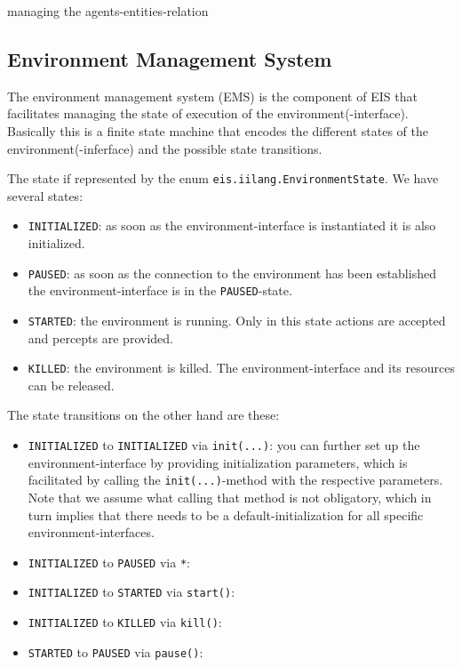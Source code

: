 \documentclass[a4]{article}
\newcommand{\EIS}{\textsf{EIS}\xspace}
\begin{document}
managing the agents-entities-relation

\subsection{Environment Management System}

The environment management system (EMS) is the component of \EIS that facilitates managing the
state of execution of the environment(-interface). Basically this is a finite state machine that encodes the different
states of the environment(-inferface) and the possible state transitions.

The state if represented by the enum \texttt{eis.iilang.EnvironmentState}.
We have several states:
\begin{itemize}
\item\texttt{INITIALIZED}: 
as soon as the environment-interface is instantiated it is also initialized. 
\item\texttt{PAUSED}: as soon as the connection to the environment has been
established the environment-interface is in the \texttt{PAUSED}-state.
\item\texttt{STARTED}: the environment is running. Only in this state actions are accepted and 
percepts are provided. 
\item\texttt{KILLED}: the environment is killed. The environment-interface  and its resources can be released.
\end{itemize}

The state transitions on the other hand are these:
\begin{itemize}
\item \texttt{INITIALIZED} to \texttt{INITIALIZED} via \texttt{init(...)}: you can further set up the environment-interface by providing initialization parameters, which is facilitated by calling the \texttt{init(...)}-method with the respective parameters. Note that we assume what calling that method is not obligatory, which in turn implies that there needs to
be a default-initialization for all specific environment-interfaces.
\item \texttt{INITIALIZED} to \texttt{PAUSED} via \texttt{*}:
\item \texttt{INITIALIZED} to \texttt{STARTED} via \texttt{start()}:
\item \texttt{INITIALIZED} to \texttt{KILLED} via \texttt{kill()}:
\item \texttt{STARTED} to \texttt{PAUSED} via \texttt{pause()}:
\end{itemize}
\end{document}
